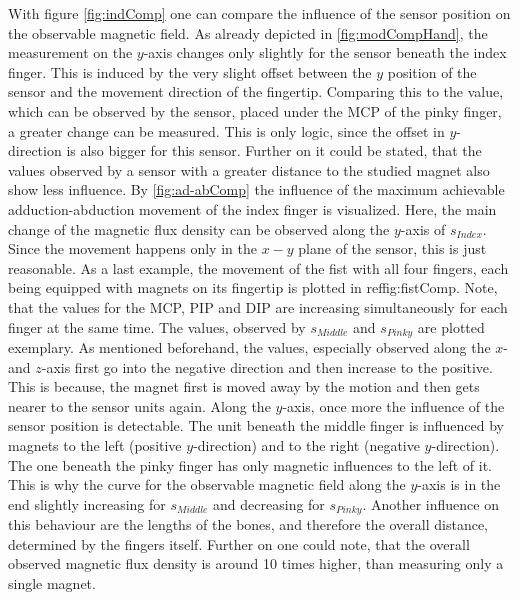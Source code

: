 With figure \ref{fig:indComp} one can compare the influence of the sensor position on the observable magnetic field. As already depicted in \ref{fig:modCompHand}, the measurement on the $ y $-axis changes only slightly for the sensor beneath the index finger. This is induced by the very slight offset between the $ y $ position of the sensor and the movement direction of the fingertip. Comparing this to the value, which can be observed by the sensor, placed under the \ac{MCP} of the pinky finger, a greater change can be measured. This is only logic, since the offset in $ y $-direction is also bigger for this sensor. Further on it could be stated, that the values observed by a sensor with a greater distance to the studied magnet also show less influence. By \ref{fig:ad-abComp} the influence of the maximum achievable adduction-abduction movement of the index finger is visualized. Here, the main change of the magnetic flux density can be observed along the $ y $-axis of $ s_{Index} $. Since the movement happens only in the $ x-y $ plane of the sensor, this is just reasonable. As a last example, the movement of the fist with all four fingers, each being equipped with magnets on its fingertip is plotted in ref{fig:fistComp}. Note, that the values for the \ac{MCP}, \ac{PIP} and \ac{DIP} are increasing simultaneously for each finger at the same time. The values, observed by $ s_{Middle} $ and $ s_{Pinky} $ are plotted exemplary. As mentioned beforehand, the values, especially observed along the $ x $- and $ z $-axis first go into the negative direction and then increase to the positive. This is because, the magnet first is moved \grqq away \grqq by the motion and then gets nearer to the sensor units again. Along the $ y $-axis, once more the influence of the sensor position is detectable. The unit beneath the middle finger is influenced by magnets to the left (positive $ y $-direction) and to the right (negative $ y $-direction). The one beneath the pinky finger has only magnetic influences to the left of it. This is why the curve for the observable magnetic field along the $ y $-axis is in the end slightly increasing for $ s_{Middle} $ and decreasing for $ s_{Pinky} $. Another influence on this behaviour are the lengths of the bones, and therefore the overall distance, determined by the fingers itself. Further on one could note, that the overall observed magnetic flux density is around 10 times higher, than measuring only a single magnet.


